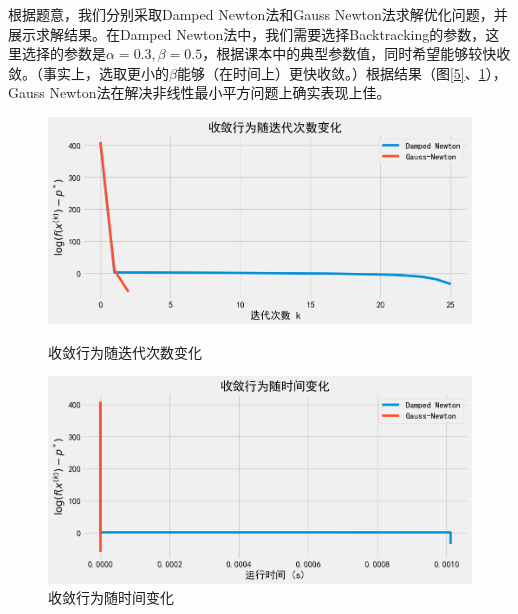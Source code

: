 \documentclass{homework}
\begin{document}
\begin{sol}

根据题意，我们分别采取Damped Newton法和Gauss Newton法求解优化问题，并展示求解结果。在Damped Newton法中，我们需要选择Backtracking的参数，这里选择的参数是$\alpha = 0.3, \beta= 0.5$，根据课本中的典型参数值，同时希望能够较快收敛。（事实上，选取更小的$\beta$能够（在时间上）更快收敛。）根据结果（图\ref{5}、\ref{5-2}），Gauss Newton法在解决非线性最小平方问题上确实表现上佳。

\begin{figure}[h]
    \centering
    \begin{minipage}[t]{0.48\textwidth}
        \centering
        \includegraphics[width=\linewidth]{5-1.png}
        \caption{收敛行为随迭代次数变化}\label{5}
    \end{minipage}
    \hfill %
    \begin{minipage}[t]{0.48\textwidth}
        \centering
        \includegraphics[width=\linewidth]{5-2.png}
        \caption{收敛行为随时间变化}\label{5-2}
    \end{minipage}
\end{figure}

\end{sol}

\question
\end{document}
